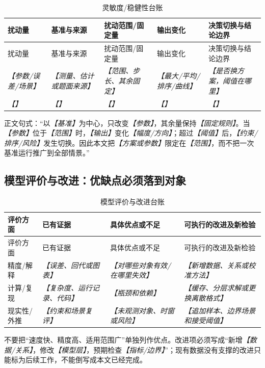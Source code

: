 \documentclass[UTF8,zihao=-4]{ctexart}
\newcommand{\slot}[1]{\textcolor{inkblue}{\textit{【#1】}}}
\begin{document}
\begin{longtable}{p{2.4cm}p{3.0cm}p{3.0cm}p{3.0cm}p{3.5cm}}
\caption{灵敏度/稳健性台账}\label{tab:template-sensitivity-ledger}\\
\toprule
扰动量 & 基准与来源 & 扰动范围/固定量 & 输出变化 & 决策切换与结论边界\\
\midrule
\endfirsthead
\toprule
扰动量 & 基准与来源 & 扰动范围/固定量 & 输出变化 & 决策切换与结论边界\\
\midrule
\endhead
\slot{参数/误差/场景} & \slot{测量、估计或题面来源} & \slot{范围、步长、其余固定} & \slot{最大/平均/排序/曲线} & \slot{是否换方案，阈值在哪里}\\
\slot{} & \slot{} & \slot{} & \slot{} & \slot{}\\
\bottomrule
\end{longtable}

正文句式：“以\slot{基准}为中心，只改变\slot{参数}，其余量保持\slot{固定规则}。当\slot{参数}位于\slot{范围}时，\slot{输出}变化\slot{幅度/方向}；超过\slot{阈值}后，\slot{约束/排序/风险}发生切换。因此本文把\slot{方案或参数}限定在\slot{范围}，而不把一次基准运行推广到全部情景。”

\subsection{模型评价与改进：优缺点必须落到对象}

\begin{longtable}{p{2.3cm}p{4.0cm}p{3.6cm}p{3.8cm}}
\caption{模型评价与改进台账}\label{tab:template-evaluation-ledger}\\
\toprule
评价方面 & 已有证据 & 具体优点或不足 & 可执行的改进及新检验\\
\midrule
\endfirsthead
\toprule
评价方面 & 已有证据 & 具体优点或不足 & 可执行的改进及新检验\\
\midrule
\endhead
精度/解释 & \slot{误差、回代或图表} & \slot{对哪些对象有效/在哪里失效} & \slot{新增数据、关系或校准方法}\\
计算/复现 & \slot{复杂度、运行记录、代码} & \slot{瓶颈和依赖} & \slot{缓存、分层求解或更换离散格式}\\
现实性/外推 & \slot{约束和场景复评} & \slot{未观测对象、时窗或风险} & \slot{追加样本、边界场景和接受阈值}\\
\bottomrule
\end{longtable}

不要把“速度快、精度高、适用范围广”单独列作优点。改进项必须写成“新增\slot{数据/关系}，修改\slot{模型层}，预期检查\slot{指标/边界}”；现有数据没有支撑的改进只能标为后续工作，不能倒写成本文已经完成。
\end{document}
